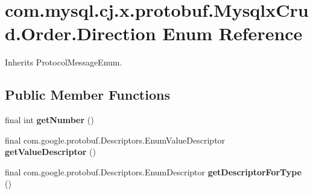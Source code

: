 \hypertarget{enumcom_1_1mysql_1_1cj_1_1x_1_1protobuf_1_1_mysqlx_crud_1_1_order_1_1_direction}{}\section{com.\+mysql.\+cj.\+x.\+protobuf.\+Mysqlx\+Crud.\+Order.\+Direction Enum Reference}
\label{enumcom_1_1mysql_1_1cj_1_1x_1_1protobuf_1_1_mysqlx_crud_1_1_order_1_1_direction}


Inherits Protocol\+Message\+Enum.

\subsection*{Public Member Functions}
\begin{DoxyCompactItemize}
\item 
\mbox{\label{enumcom_1_1mysql_1_1cj_1_1x_1_1protobuf_1_1_mysqlx_crud_1_1_order_1_1_direction_a6ac82ea59955f7040d23932431feb688}} 
final int {\bfseries get\+Number} ()
\item 
\mbox{\label{enumcom_1_1mysql_1_1cj_1_1x_1_1protobuf_1_1_mysqlx_crud_1_1_order_1_1_direction_a9f6b8b1e83daff62739b70fd9452ff90}} 
final com.\+google.\+protobuf.\+Descriptors.\+Enum\+Value\+Descriptor {\bfseries get\+Value\+Descriptor} ()
\item 
\mbox{\label{enumcom_1_1mysql_1_1cj_1_1x_1_1protobuf_1_1_mysqlx_crud_1_1_order_1_1_direction_a08fe7dec3155300327c4eea20bcfae7b}} 
final com.\+google.\+protobuf.\+Descriptors.\+Enum\+Descriptor {\bfseries get\+Descriptor\+For\+Type} ()
\end{DoxyCompactItemize}
